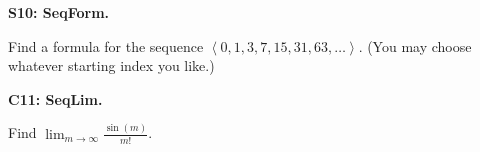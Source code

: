 \documentclass[12pt]{article}
\newcommand{\<}{\left\langle}
\renewcommand{\>}{\right\rangle}
\newcommand{\exerciseHeader}[4]{


  \vspace{0.5em}
  \textbf{#2}
  \vspace{0.5em}

}
\begin{document}
\begin{multicols}{2}
%

%

\exerciseHeader{2017 July 11}{S10: SeqForm.}{
Define and use explicit and recursive formulas for sequences.
}{3/3}

Find a formula for the sequence \(\<0,1,3,7,15,31,63,\dots\>\).
(You may choose whatever starting index you like.)



%

%

%

%

\exerciseHeader{2017 July 13}{C11: SeqLim.}{
Compute the limit of a convergent sequence.
}{4/4}

Find \(\displaystyle\lim_{m\to\infty}\frac{\sin(m)}{m!}\).


%


\end{multicols}
\end{document}
